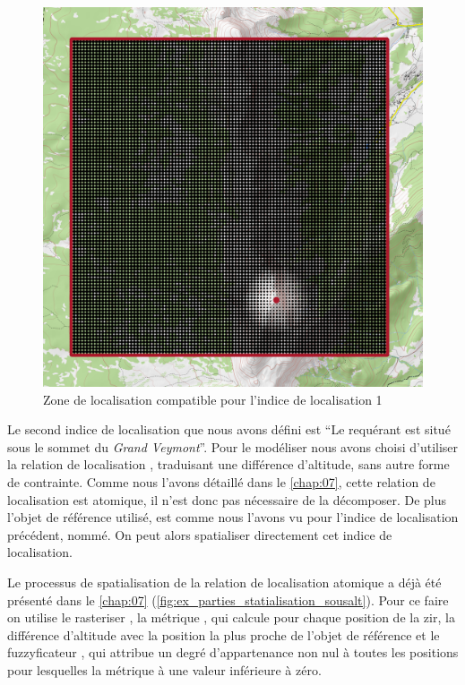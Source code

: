 \begin{figure}
  \centering
  \includegraphics{./figures/PasSommet_GrandVeymont.png}
  \caption{Zone de localisation compatible pour l'indice de
    localisation 1}
  \label{fig:ZLC_GrandVeymont_1}
\end{figure}


Le second indice de localisation que nous avons défini est \enquote{Le
  requérant est situé sous le sommet du \emph{Grand Veymont}}. Pour le
modéliser nous avons choisi d'utiliser la relation de localisation
, traduisant une différence d'altitude, sans
autre forme de contrainte. Comme nous l'avons détaillé dans le
\autoref{chap:07}, cette relation de localisation est atomique, il
n'est donc pas nécessaire de la décomposer. De plus l'objet de
référence utilisé, est comme nous l'avons vu pour l'indice de
localisation précédent, nommé. On peut alors spatialiser directement
cet indice de localisation.

Le processus de spatialisation de la relation de localisation atomique
 a déjà été présenté dans le
\autoref{chap:07}
(\autoref{fig:ex_parties_statialisation_sousalt}). Pour ce faire on
utilise le rasteriser , la métrique
, qui calcule pour chaque position de
la \ac{zir}, la différence d'altitude avec la position la plus proche
de l'objet de référence et le fuzzyficateur ,
qui attribue un degré d'appartenance non nul à toutes les positions
pour lesquelles la métrique à une valeur inférieure à zéro.

